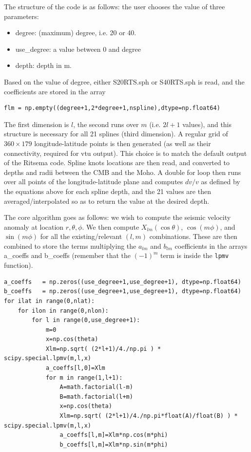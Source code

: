 The structure of the code is as follows: the user chooses the value of three parameters:
\begin{itemize}
\item {\codefont degree}: (maximum) degree, i.e. 20 or 40.
\item {\codefont use\_degree}: a value between 0 and {\codefont degree}
\item {\codefont depth}: depth in \si{m}.
\end{itemize}
Based on the value of {\codefont degree}, either {\filenamefont S20RTS.sph} or {\filenamefont S40RTS.sph} is read,
and the coefficients are stored in the array
\begin{verbatim}
flm = np.empty((degree+1,2*degree+1,nspline),dtype=np.float64)
\end{verbatim}
The first dimension is $l$, the second runs over $m$ (i.e. $2l+1$ values), 
and this structure is necessary for all 21 splines (third dimension).
A regular grid of $360\times 179$ longitude-latitude points is then generated (as well as their connectivity, required for vtu output). This choice is to match the default output of the Ritsema code.
Spline knots locations are then read, and converted to depths and radii between the CMB and the Moho.
A double for loop then runs over all points of the longitude-latitude plane and computes $dv/v$ as defined by the equations above 
for each spline depth, and the 21 values are then averaged/interpolated so as to return the value at the desired depth. 

The core algorithm goes as follows: we wish to compute the seismic velocity anomaly 
at location $r,\theta,\phi$.
We then compute $X_{lm}(\cos \theta)$, $\cos (m\phi)$, and $\sin (m\phi)$ 
for all the existing/relevant $(l,m)$ combinations. 
These are then combined to store the terms multiplying the $a_{lm}$ and $b_{lm}$ coefficients 
in the arrays {\codefont a\_coeffs} and {\codefont b\_coeffs}
(remember that the $(-1)^m$ term is inside the \texttt{lpmv} function).

\begin{lstlisting}
a_coeffs   = np.zeros((use_degree+1,use_degree+1), dtype=np.float64)
b_coeffs   = np.zeros((use_degree+1,use_degree+1), dtype=np.float64)
for ilat in range(0,nlat): 
    for ilon in range(0,nlon): 
        for l in range(0,use_degree+1):
            m=0
            x=np.cos(theta)
            Xlm=np.sqrt( (2*l+1)/4./np.pi ) * scipy.special.lpmv(m,l,x) 
            a_coeffs[l,0]=Xlm
            for m in range(1,l+1):
                A=math.factorial(l-m)
                B=math.factorial(l+m)
                x=np.cos(theta)
                Xlm=np.sqrt( (2*l+1)/4./np.pi*float(A)/float(B) ) * scipy.special.lpmv(m,l,x) 
                a_coeffs[l,m]=Xlm*np.cos(m*phi)
                b_coeffs[l,m]=Xlm*np.sin(m*phi)
\end{lstlisting}

